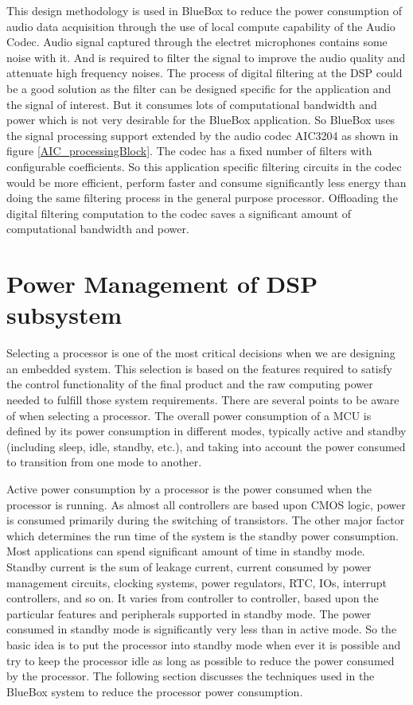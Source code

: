 This design methodology is used in BlueBox to reduce the power consumption of audio data acquisition through the use of local compute capability of the Audio Codec. Audio signal captured through the electret microphones contains some noise with it. And is required to filter the signal to improve the audio quality and attenuate high frequency noises. The process of digital filtering at the DSP could be a good solution as the filter can be designed specific for the application and the signal of interest. But it consumes lots of computational bandwidth and power which is not very desirable for the BlueBox application. So BlueBox uses the signal processing support extended by the audio codec AIC3204 as shown in figure \ref{AIC_processingBlock}. The codec has a fixed number of filters with configurable coefficients. So this application specific filtering circuits in the codec would be more efficient, perform faster and consume significantly less energy than doing the same filtering process in the general purpose processor. Offloading the digital filtering computation to the codec saves a significant amount of computational bandwidth and power.
 
\section{Power Management of DSP subsystem }

Selecting a processor is one of the most critical decisions when we are designing an embedded 
system. This selection is based on the features required to satisfy the control functionality of the final product and the raw computing power needed to fulfill those system requirements. There are several points to be aware of when selecting a processor. The overall power consumption of a MCU is defined by its power consumption in different modes, typically active and standby (including sleep, idle, standby, etc.), and taking into account the power consumed to transition from one mode to another. 

 Active power consumption by a processor is the power consumed when the processor is running. As almost all controllers are based upon CMOS logic, power is consumed primarily during the switching of transistors. The other major factor which determines the run time of the system is the standby power consumption. Most applications can spend significant amount of time in standby mode. Standby current is the sum of leakage current, current consumed by power management circuits, clocking systems, power regulators, RTC, IOs, interrupt controllers, and so on. It varies from controller to controller, based upon the particular features and peripherals supported in standby mode. The power consumed in standby mode is significantly very less than in active mode. So the basic idea is to put the processor into standby mode when ever it is possible and try to keep the processor idle as long as possible to reduce the power consumed by the processor. The following section discusses the techniques used in the BlueBox system to reduce the processor power consumption. 



